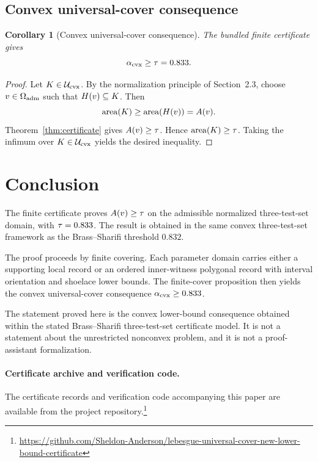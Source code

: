 \documentclass[11pt]{article}
\newtheorem{corollary}{Corollary}
\begin{document}
\subsection{Convex universal-cover consequence}

\begin{corollary}[Convex universal-cover consequence]\label{cor:convex}
The bundled finite certificate gives
\[
\alpha_{\mathrm{cvx}}\ge\tau=0.833.
\]
\end{corollary}

\begin{proof}
Let \(K\in\mathcal{U}_{\mathrm{cvx}}\).  By the normalization principle of Section~2.3, choose \(v\in\Omega_{\mathrm{adm}}\) such that \(H(v)\subseteq K\).  Then
\[
\operatorname{area}(K)\ge\operatorname{area}(H(v))=A(v).
\]
Theorem~\ref{thm:certificate} gives \(A(v)\ge\tau\).  Hence \(\operatorname{area}(K)\ge\tau\).  Taking the infimum over \(K\in\mathcal{U}_{\mathrm{cvx}}\) yields the desired inequality.
\end{proof}

\section{Conclusion}

The finite certificate proves \(A(v)\ge\tau\) on the admissible normalized three-test-set domain, with \(\tau=0.833\).  The result is obtained in the same convex three-test-set framework as the Brass--Sharifi threshold \(0.832\).

The proof proceeds by finite covering.  Each parameter domain carries either a supporting local record or an ordered inner-witness polygonal record with interval orientation and shoelace lower bounds.  The finite-cover proposition then yields the convex universal-cover consequence \(\alpha_{\mathrm{cvx}}\ge0.833\).

The statement proved here is the convex lower-bound consequence obtained within the stated Brass--Sharifi three-test-set certificate model.  It is not a statement about the unrestricted nonconvex problem, and it is not a proof-assistant formalization.

\paragraph{Certificate archive and verification code.}
The certificate records and verification code accompanying this paper are available from the project repository.\footnote{\url{https://github.com/Sheldon-Anderson/lebesgue-universal-cover-new-lower-bound-certificate}}
\end{document}
